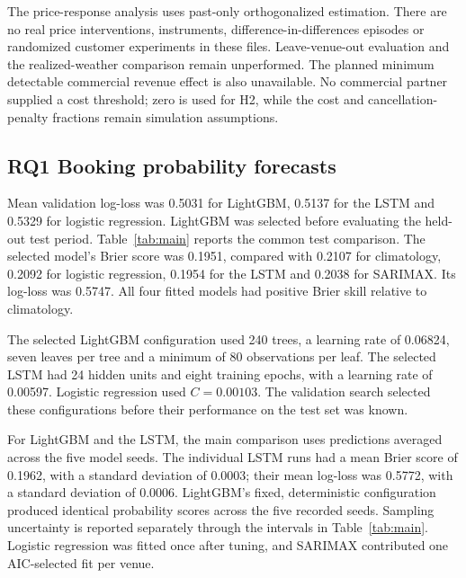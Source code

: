 The price-response analysis uses past-only orthogonalized estimation. There are no real price interventions, instruments, difference-in-differences episodes or randomized customer experiments in these files. Leave-venue-out evaluation and the realized-weather comparison remain unperformed. The planned minimum detectable commercial revenue effect is also unavailable. No commercial partner supplied a cost threshold; zero is used for H2, while the cost and cancellation-penalty fractions remain simulation assumptions. 

\subsection{RQ1 Booking probability forecasts}


Mean validation log-loss was 0.5031 for LightGBM, 0.5137 for the LSTM and 0.5329 for logistic regression. LightGBM was selected before evaluating the held-out test period. Table~\ref{tab:main} reports the common test comparison. The selected model's Brier score was 0.1951, compared with 0.2107 for climatology, 0.2092 for logistic regression, 0.1954 for the LSTM and 0.2038 for SARIMAX. Its log-loss was 0.5747. All four fitted models had positive Brier skill relative to climatology.

The selected LightGBM configuration used 240 trees, a learning rate of 0.06824, seven leaves per tree and a minimum of 80 observations per leaf. The selected LSTM had 24 hidden units and eight training epochs, with a learning rate of 0.00597. Logistic regression used $C=0.00103$. The validation search selected these configurations before their performance on the test set was known.

For LightGBM and the LSTM, the main comparison uses predictions averaged across the five model seeds. The individual LSTM runs had a mean Brier score of 0.1962, with a standard deviation of 0.0003; their mean log-loss was 0.5772, with a standard deviation of 0.0006. LightGBM's fixed, deterministic configuration produced identical probability scores across the five recorded seeds. Sampling uncertainty is reported separately through the intervals in Table~\ref{tab:main}. Logistic regression was fitted once after tuning, and SARIMAX contributed one AIC-selected fit per venue.


